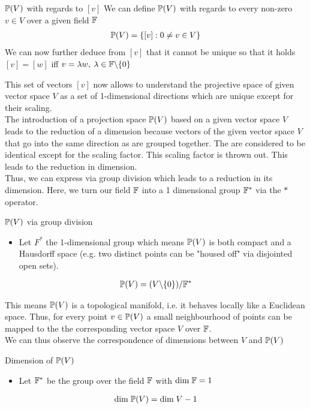 \begin{definitionBox}{$\mathbb{P}(V)$ with regards to $[v]$}
    We can define $\mathbb{P}(V)$ with regards to every non-zero $v \in V$ over a given field $\mathbb{F}$
    \begin{gather*}
        \mathbb{P}(V) = \{[v]: 0 \neq v \in V\}
    \end{gather*}
    We can now further deduce from $[v]$ that it cannot be unique so that it holds $[v] = [w]$ iff $v = \lambda w, \: \lambda \in \mathbb{F} \backslash \{0\}$
\end{definitionBox}

This set of vectors $[v]$ now allows to understand the projective space of given vector space $V$ as a set of 1-dimensional directions which are unique except for their scaling. \\
The introduction of a projection space $\mathbb{P}(V)$ based on a given vector space $V$ leads to the reduction of a dimension because vectors of the given vector space $V$ that go into the same direction as are grouped together. The are considered to be identical except for the scaling factor. This scaling factor is thrown out. This leads to the reduction in dimension. \\
Thus, we can express via group division which leads to a reduction in its dimension. Here, we turn our field $\mathbb{F}$ into a 1 dimensional group $\mathbb{F}^*$ via the $*$ operator.

\begin{definitionBox}{$\mathbb{P}(V)$ via group division}
    \begin{itemize}
        \item Let $F^*$ the 1-dimensional group which means $\mathbb{P}(V)$ is both compact and a Hausdorff space (e.g. two distinct points can be "housed off" via disjointed open sets).
    \end{itemize}
    \begin{gather*}
        \mathbb{P}(V) = (V \backslash \{ 0 \}) /\mathbb{F}^*
    \end{gather*}
\end{definitionBox}

This means $\mathbb{P}(V)$ is a topological manifold, i.e. it behaves locally like a Euclidean space. Thus, for every point $v \in \mathbb{P}(V)$ a small neighbourhood of points can be mapped to the the corresponding vector space $V$ over $\mathbb{F}$. \\

We can thus observe the correspondence of dimensions between $V$ and $\mathbb{P}(V)$
\begin{definitionBox}{Dimension of $\mathbb{P}(V)$}
    \begin{itemize}
        \item Let $\mathbb{F}^*$ be the group over the field $\mathbb{F}$ with $\mathrm{dim}\;\mathbb{F} = 1$
    \end{itemize}
    \begin{gather*}
        \mathrm{dim}\; \mathbb{P}(V) = \mathrm{dim}\; V -1
    \end{gather*}
\end{definitionBox}

